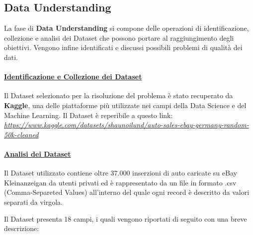 \subsection{Data Understanding}
La fase di \textbf{Data Understanding} si compone delle operazioni di identificazione, collezione e analisi dei Dataset che possono portare al raggiungimento degli obiettivi. Vengono infine identificati e discussi possibili problemi di qualità dei dati.

\paragraph{\textcolor[HTML]{000099}{\underline{Identificazione e Collezione dei Dataset}}}
Il Dataset selezionato per la risoluzione del problema è stato recuperato da \textbf{Kaggle}, una delle piattaforme più utilizzate nei campi della Data Science e del Machine Learning. Il Dataset è reperibile a questo link:
\textcolor{blue}{\textit{\url{https://www.kaggle.com/datasets/shaunoilund/auto-sales-ebay-germany-random-50k-cleaned}}}

\paragraph{\textcolor[HTML]{000099}{\underline{Analisi dei Dataset}}}
Il Dataset utilizzato contiene oltre 37.000 inserzioni di auto caricate su eBay Kleinanzeigan da utenti privati ed è rappresentato da un file in formato .csv (Comma-Separeted Values) all'interno del quale ogni record è descritto da valori separati da virgola.

Il Dataset presenta 18 campi, i quali vengono riportati di seguito con una breve descrizione:

